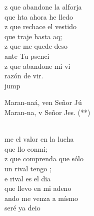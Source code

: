 \begin{cancion}%
	z que abandone la alforja\\
	que hta ahora he lledo\\
	z que rechace el vestido\\
	que traje hasta aq; \\
	z que me quede deso\\
	ante Tu psenci\\
	z que abandone mi vi\\
	razón de vir.\\jump\\
	\begin{chorus}%
	Maran-naá, ven Señor Jú\\
	Maran-na, v Señor Jes. (**)  \\
	\end{chorus}%
	\jump\\
	me el valor en la lucha\\
	que llo conmi; \\
	z que comprenda que sólo\\
	un rival tengo ;\\
	e rival es el dia\\
	que llevo en mi adeno\\
	ando me venza a mísmo\\
	seré ya deio\\
\end{cancion}%
